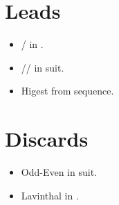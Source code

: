 \section{Leads} \label{sec:}

\begin{itemize}
  \item {}/ in \N.
  \item {}// in suit.
  \item Higest from sequence.
\end{itemize}

\section{Discards} \label{sec:}

\begin{itemize}
  \item Odd-Even in suit.
  \item Lavinthal in \N.
\end{itemize}
